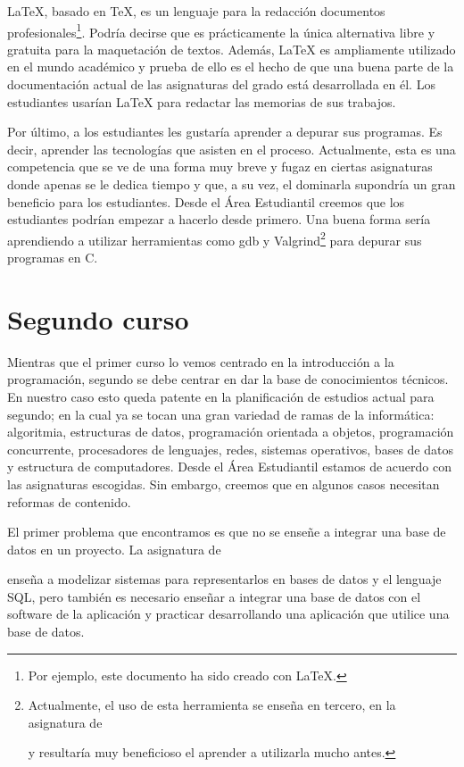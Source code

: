\LaTeX, basado en \TeX, es un lenguaje para
la redacción documentos profesionales\footnote{
    Por ejemplo, este documento ha sido creado con \LaTeX.
}.
Podría decirse que es prácticamente la única alternativa
libre y gratuita para la maquetación de textos.
Además, \LaTeX{} es ampliamente utilizado en el mundo académico y prueba de
ello es el hecho de que una buena parte de la documentación actual de las
 asignaturas del grado está desarrollada en él.
Los estudiantes usarían \LaTeX{} para redactar las memorias de sus trabajos.

Por último, a los estudiantes les gustaría aprender a depurar sus programas.
Es decir, aprender las tecnologías que asisten en el proceso.
Actualmente, esta es una competencia que se ve de una forma muy breve y fugaz
en ciertas asignaturas donde apenas se le dedica tiempo y que, a su vez, el
dominarla supondría un gran beneficio para los estudiantes.
Desde el Área Estudiantil creemos que los estudiantes podrían empezar a
hacerlo desde primero.
Una buena forma sería
aprendiendo a utilizar herramientas como gdb y Valgrind\footnote{Actualmente,
 el uso de esta herramienta se enseña en tercero, en la asignatura de
 \subject{Ampliación de Sistemas Operativos} y resultaría muy beneficioso el
 aprender a utilizarla mucho antes.} para depurar sus programas en C.

\section{Segundo curso}

Mientras que el primer curso lo vemos centrado en
la introducción a la programación,
segundo se debe centrar en dar la base de conocimientos técnicos.
En nuestro caso esto queda patente en
la planificación de estudios actual para segundo;
en la cual ya se tocan una gran variedad de ramas de la informática:
algoritmia, estructuras de datos, programación orientada a objetos,
programación concurrente, procesadores de lenguajes, redes, sistemas operativos,
bases de datos y estructura de computadores.
Desde el Área Estudiantil estamos de acuerdo con las asignaturas escogidas.
Sin embargo, creemos que en algunos casos necesitan reformas de contenido.

El primer problema que encontramos es
que no se enseñe a integrar una base de datos en un proyecto.
La asignatura de \subject{Bases de Datos} enseña a
modelizar sistemas para representarlos en bases de datos y el lenguaje SQL,
pero también es necesario enseñar a
integrar una base de datos con el software de la aplicación y
practicar desarrollando una aplicación que utilice una base de datos.

